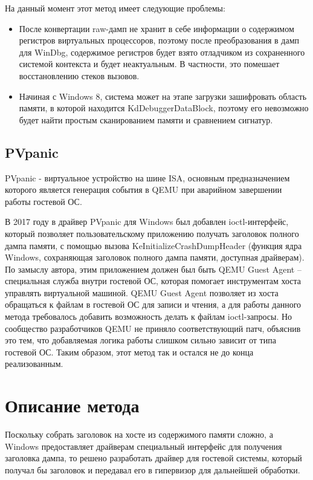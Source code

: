 \documentclass{mipt-thesis-bs}
\begin{document}
На данный момент этот метод имеет следующие проблемы:

\begin{itemize}
    \item После конвертации raw-дамп не хранит в себе информации о содержимом регистров виртуальных процессоров, поэтому после преобразования в дамп для WinDbg, содержимое регистров будет взято отладчиком из сохраненного системой контекста и будет неактуальным. В частности, это помешает восстановлению стеков вызовов.
    \item Начиная с Windows 8, система может на этапе загрузки зашифровать область памяти, в которой находится KdDebuggerDataBlock, поэтому его невозможно будет найти простым сканированием памяти и сравнением сигнатур.
\end{itemize}

\section*{PVpanic}

PVpanic - виртуальное устройство на шине ISA, основным предназначением которого является генерация события в QEMU при аварийном завершении работы гостевой ОС.

В 2017 году в драйвер PVpanic для Windows был добавлен ioctl-интерфейс, который позволяет пользовательскому приложению получать заголовок полного дампа памяти, с помощью вызова KeInitializeCrashDumpHeader (функция ядра Windows, сохраняющая заголовок полного дампа памяти, доступная драйверам). По замыслу автора, этим приложением должен был быть QEMU Guest Agent -- специальная служба внутри гостевой ОС, которая помогает инструментам хоста управлять виртуальной машиной. QEMU Guest Agent позволяет из хоста обращаться к файлам в гостевой ОС для записи и чтения, а для работы данного метода требовалось добавить возможность делать к файлам ioctl-запросы. Но сообщество разработчиков QEMU не приняло соответствующий патч, объяснив это тем, что добавляемая логика работы слишком сильно зависит от типа гостевой ОС. 
Таким образом, этот метод так и остался не до конца реализованным.

\chapter{Описание метода}

Поскольку собрать заголовок на хосте из содержимого памяти сложно, а Windows предоставляет драйверам специальный интерфейс для получения заголовка дампа, то решено разработать драйвер для гостевой системы, который получал бы заголовок и передавал его в гипервизор для дальнейшей обработки.
\end{document}

